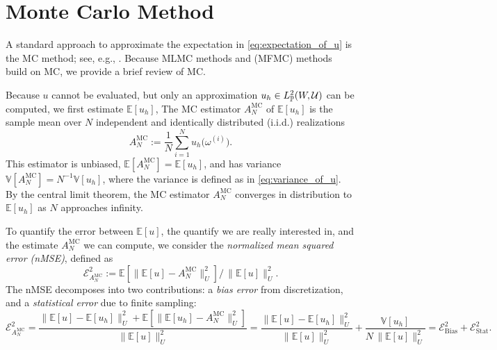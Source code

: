 
\section{Monte Carlo Method}\label{sec:MC}

A standard approach to approximate the expectation in \eqref{eq:expectation_of_u} is the MC method; 
see, e.g.,  \cite{MBGiles_2015a,MDGunzburger_CGWebster_GZhang_2014a}.
Because MLMC methods \cite{MBGiles_2015a,SHeinrich_2001a} and 
(MFMC) methods  \cite{BPeherstorfer_KWillcox_MDGunzburger_2016a, BPeherstorfer_KWillcox_MDGunzburger_2018a}  build on MC, we provide a brief review of MC.


Because $u$ cannot be evaluated, but only an approximation $u_h \in   L_{\mathbb{P}}^2(W, \mathcal{U})$ can be 
computed, we first estimate $\mathbb{E}[u_h ]$, 
The MC estimator $A^{\text{MC}}_{N}$ of $\mathbb{E}[u_h ]$ 
is the sample mean over $N$ independent and identically distributed (i.i.d.) realizations 
\begin{equation}\label{eq:MC_estimator}
    A^{\text{MC}}_{N} := \frac{1}{N}\sum_{i=1}^{N} u_h \big(\omega^{(i)} \big).
\end{equation}
%
This estimator is unbiased,  $\mathbb{E}[A^{\text{MC}}_{N}] = \mathbb{E}[u_h ]$, 
and has variance $\mathbb{V}[A^{\text{MC}}_{N}] = N^{-1} \mathbb{V}[u_h ]$, 
where the variance is defined as in \eqref{eq:variance_of_u}.
By the central limit theorem, the MC estimator $A^{\text{MC}}_{N}$ converges in distribution to $\mathbb{E}[u_h]$ as $N$ approaches infinity. 

To quantify the error between $\mathbb{E}[u]$, the quantify we are really interested in, and the estimate $A^{\text{MC}}_{N}$ we can compute,
we consider the  {\it normalized mean squared error (nMSE)}, defined as
 \[
             \mathcal{E}_{A^{\text{MC}}_{N}}^2:= \mathbb E\left[ \big\| \mathbb{E}[u]-A^{\text{MC}}_{N}  \big\| _{U}^2\right]  
                                                                           \big/ \, \big\| \mathbb{E}[u]  \big\| _{U}^2.
\] 
The nMSE decomposes into two contributions: a {\it bias error} from  discretization, and a {\it statistical error} due to finite sampling:
%
\[
\mathcal{E}_{A^{\text{MC}}_{N}}^2 
= \frac{ \big\| \mathbb{E}[u]-\mathbb{E}[u_h ]  \big\| _{U}^2
               +\mathbb E\left[ \big\|  \mathbb{E}[u_h ] -A^{\text{MC}}_{N}  \big\| _{U}^2\right]}{ \big\| \mathbb{E}[u]  \big\| _{U}^2} 
= \frac{ \big\| \mathbb{E}[u]-\mathbb{E}[u_h ]  \big\| _{U}^2}{ \big\| \mathbb{E}[u]  \big\| _{U}^2}
    +\frac{\mathbb{V}\left[u_h \right]} {N \, \big\| \mathbb{E}[u]  \big\| _{U}^2}
=\mathcal{E}_{\text{Bias}}^2 + \mathcal{E}_{\text{Stat}}^2.
\]



